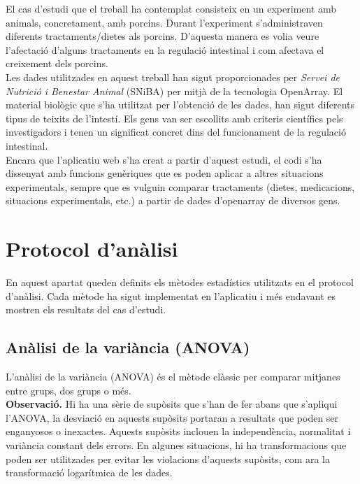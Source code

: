 \documentclass[english]{article}
\begin{document}
El cas d'estudi que el treball ha contemplat consisteix en un experiment amb animals, concretament, amb porcins. Durant l'experiment s'administraven diferents tractaments/dietes als porcins. D'aquesta manera es volia veure l'afectació d'alguns tractaments en la regulació intestinal i com afectava el creixement dels porcins.
\\

Les dades utilitzades en aquest treball han sigut proporcionades per \textit{Servei de Nutrició i Benestar Animal} (SNiBA) per mitjà de la tecnologia OpenArray. El material biològic que s'ha utilitzat per l'obtenció de les dades, han sigut diferents tipus de teixits de l'intestí. Els gens van ser escollits amb criteris científics pels investigadors i tenen un significat concret dins del funcionament de la regulació intestinal.
\\

Encara que l'aplicatiu web s'ha creat a partir d'aquest estudi, el codi s'ha dissenyat amb funcions genèriques que es poden aplicar a altres situacions experimentals, sempre que es vulguin comparar tractaments (dietes, medicacions, situacions experimentals, etc.) a partir de dades d'openarray de diversos gens.

\section{Protocol d'anàlisi}
En aquest apartat queden definits els mètodes estadístics utilitzats en el protocol d'anàlisi. Cada mètode ha sigut implementat en l'aplicatiu i més endavant es mostren els resultats del cas d'estudi.
\subsection{Anàlisi de la variància (ANOVA)}
L'anàlisi de la variància (ANOVA) és el mètode clàssic per comparar mitjanes entre grups, dos grups o més.
\\

\noindent\textbf{Observació.} Hi ha una sèrie de supòsits que s'han de fer abans que s'apliqui l'ANOVA, la desviació en aquests supòsits portaran a resultats que poden ser enganyosos o inexactes. Aquests supòsits inclouen la independència, normalitat i variància constant dels errors. En algunes situacions, hi ha transformacions que poden ser utilitzades per evitar les violacions d'aquests supòsits, com ara la transformació logarítmica de les dades.
\\
\end{document}
